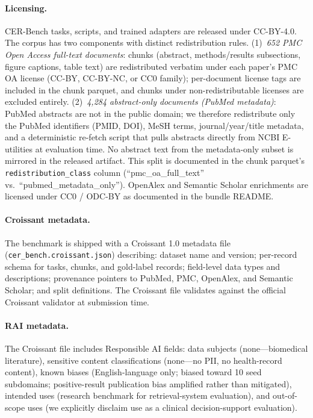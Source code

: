 \documentclass{article}
\begin{document}
\paragraph{Licensing.} CER-Bench tasks, scripts, and trained adapters are released under CC-BY-4.0. The corpus has two components with distinct redistribution rules. (1)~\emph{652 PMC Open Access full-text documents}: chunks (abstract, methods/results subsections, figure captions, table text) are redistributed verbatim under each paper's PMC OA license (CC-BY, CC-BY-NC, or CC0 family); per-document license tags are included in the chunk parquet, and chunks under non-redistributable licenses are excluded entirely. (2)~\emph{4{,}284 abstract-only documents (PubMed metadata)}: PubMed abstracts are not in the public domain; we therefore redistribute only the PubMed identifiers (PMID, DOI), MeSH terms, journal/year/title metadata, and a deterministic re-fetch script that pulls abstracts directly from NCBI E-utilities at evaluation time. No abstract text from the metadata-only subset is mirrored in the released artifact. This split is documented in the chunk parquet's \texttt{redistribution\_class} column (``pmc\_oa\_full\_text'' vs.\ ``pubmed\_metadata\_only''). OpenAlex and Semantic Scholar enrichments are licensed under CC0 / ODC-BY as documented in the bundle README.

\paragraph{Croissant metadata.} The benchmark is shipped with a Croissant 1.0 metadata file (\texttt{cer\_bench.croissant.json}) describing: dataset name and version; per-record schema for tasks, chunks, and gold-label records; field-level data types and descriptions; provenance pointers to PubMed, PMC, OpenAlex, and Semantic Scholar; and split definitions. The Croissant file validates against the official Croissant validator at submission time.

\paragraph{RAI metadata.} The Croissant file includes Responsible AI fields: data subjects (none---biomedical literature), sensitive content classifications (none---no PII, no health-record content), known biases (English-language only; biased toward 10 seed subdomains; positive-result publication bias amplified rather than mitigated), intended uses (research benchmark for retrieval-system evaluation), and out-of-scope uses (we explicitly disclaim use as a clinical decision-support evaluation).
\end{document}
